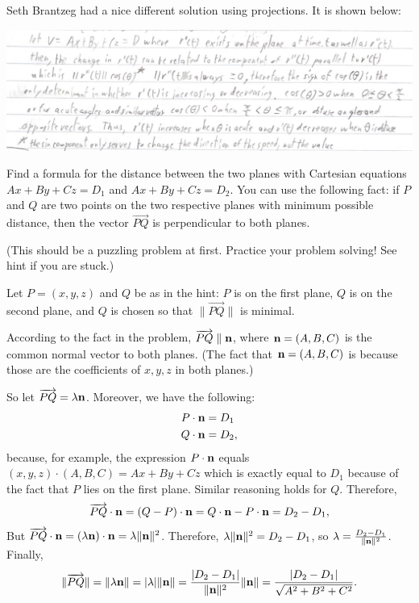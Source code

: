 \begin{problem}
\begin{enumerate}[(a)]
\begin{solution}
      Seth Brantzeg had a nice different solution using projections. It is shown below:
      \begin{center}
        \includegraphics[width=\textwidth]{nice/p2.3b_seth.png}
      \end{center}
    \end{solution}
  \end{enumerate}
\end{problem}

\begin{problem}
  Find a formula for the distance between the two planes with Cartesian equations $Ax+By+Cz=D_1$ and $Ax+By+Cz=D_2$. You can use the following fact: if $P$ and $Q$ are two points on the two respective planes with minimum possible distance, then the vector $\overrightarrow{PQ}$ is perpendicular to both planes.

  (This should be a puzzling problem at first. Practice your problem solving! See hint if you are stuck.)
\end{problem}
\begin{solution}
  Let $P=(x,y,z)$ and $Q$ be as in the hint: $P$ is on the first plane, $Q$ is on the second plane, and $Q$ is chosen so that $\|\overrightarrow{PQ}\|$ is minimal.

  According to the fact in the problem, $\overrightarrow{PQ}\parallel\mathbf n$, where $\mathbf n=(A,B,C)$ is the common normal vector to both planes. (The fact that $\mathbf n=(A,B,C)$ is because those are the coefficients of $x,y,z$ in both planes.)

  So let $\overrightarrow{PQ}=\lambda\mathbf n$. Moreover, we have the following:
  \begin{align*}
    P\cdot\mathbf n&= D_1\\
    Q\cdot\mathbf n &= D_2,
  \end{align*}
  because, for example, the expression $P\cdot\mathbf n$ equals $(x,y,z)\cdot(A,B,C)=Ax+By+Cz$ which is exactly equal to $D_1$ because of the fact that $P$ lies on the first plane. Similar reasoning holds for $Q$. Therefore,
  \[\overrightarrow{PQ}\cdot\mathbf n=(Q-P)\cdot \mathbf n=Q\cdot \mathbf n-P\cdot \mathbf n=D_2-D_1,\]
  But $\overrightarrow{PQ}\cdot\mathbf n=(\lambda\mathbf n)\cdot\mathbf n=\lambda\|\mathbf n\|^2$. Therefore, $\lambda\|\mathbf n\|^2=D_2-D_1$, so $\lambda=\frac{D_2-D_1}{\|\mathbf n\|^2}$. Finally,
  \[\|\overrightarrow{PQ}\|=\|\lambda\mathbf n\|=|\lambda|\|\mathbf n\|=\frac{|D_2-D_1|}{\|\mathbf n\|^2}\|\mathbf n\|=\frac{|D_2-D_1|}{\sqrt{A^2+B^2+C^2}}.\]
\end{solution}

